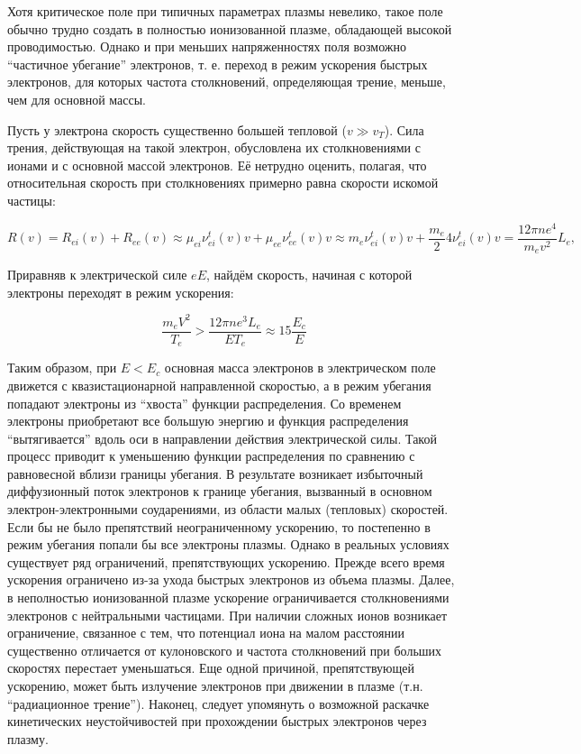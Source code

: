 \documentclass[10pt, a4paper]{article}
\begin{document}
Хотя критическое поле при типичных параметрах плазмы невелико, такое поле обычно трудно создать в полностью ионизованной плазме, обладающей высокой проводимостью. Однако и при меньших напряженностях поля возможно ``частичное убегание'' электронов, т. е. переход в режим ускорения быстрых электронов, для которых частота столкновений, определяющая трение, меньше, чем для основной массы.

Пусть у электрона скорость существенно большей тепловой ($v\gg v_T$). Сила трения, действующая на такой электрон, обусловлена их столкновениями с ионами и с основной массой электронов. Её нетрудно оценить, полагая, что относительная скорость при столкновениях примерно равна скорости искомой частицы:

\begin{equation*}
	R(v) = R_{ei}(v)+R_{ee}(v)\approx\mu_{ei}\nu_{ei}^t(v)v + \mu_{ee}\nu_{ee}^t(v)v \approx m_e\nu_{ei}^t(v)v + \frac{m_e}{2}4\nu_{ei}^t(v)v=\frac{12\pi n e^4}{m_ev^2}L_e,
\end{equation*}

Приравняв к электрической силе $eE$, найдём скорость, начиная с которой электроны переходят в режим ускорения:

\begin{equation*}
	\frac{m_eV^2}{T_e}>\frac{12\pi n e^3 L_e}{E T_e}\approx 15\frac{E_c}{E}
\end{equation*}

Таким образом, при $E<E_c$ основная масса электронов в электрическом поле движется с квазистационарной направленной скоростью, а в режим убегания попадают электроны из ``хвоста'' функции распределения. Со временем электроны приобретают все большую энергию и функция распределения ``вытягивается'' вдоль оси в направлении действия электрической силы. Такой процесс приводит к уменьшению функции распределения по сравнению с равновесной вблизи границы убегания. В результате возникает избыточный диффузионный поток электронов к границе убегания, вызванный в основном электрон-электронными соударениями, из области малых (тепловых) скоростей. Если бы не было препятствий неограниченному ускорению, то постепенно в режим убегания попали бы все электроны плазмы. Однако в реальных условиях существует ряд ограничений, препятствующих ускорению. Прежде всего время ускорения ограничено из-за ухода быстрых электронов из объема плазмы. Далее, в неполностью ионизованной плазме ускорение ограничивается столкновениями электронов с нейтральными частицами. При наличии сложных ионов возникает ограничение, связанное с тем, что потенциал иона на малом расстоянии существенно отличается от кулоновского и частота столкновений при больших скоростях перестает уменьшаться. Еще одной причиной, препятствующей ускорению, может быть излучение электронов при движении в плазме (т.н. ``радиационное трение''). Наконец, следует упомянуть о возможной раскачке кинетических неустойчивостей при прохождении быстрых электронов через плазму.
\end{document}
